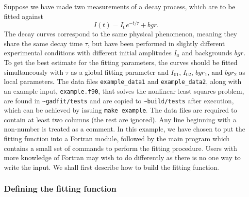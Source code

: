 \documentclass{article}
\begin{document}
Suppose we have made two measurements of a decay process, which are to be fitted against
\begin{equation}
  \label{eq:exp_decay}
  I(t) = I_0e^{-t/\tau} + bgr.
\end{equation}
The decay curves correspond to the same physical phenomenon, meaning they share the same decay time $\tau$, but have been performed in slightly different experimental conditions with different initial amplitudes $I_0$ and backgrounds $bgr$. To get the best estimate for the fitting parameters, the curves should be fitted simultaneously with $\tau$ as a global fitting parameter and $I_{01}$, $I_{02}$, $bgr_1$, and $bgr_2$ as local parameters. The data files \verb+example_data1+ and \verb+example_data2+, along with an example input, \verb+example.f90+, that solves the nonlinear least squares problem, are found in \verb+~gadfit/tests+ and are copied to \verb+~build/tests+ after execution, which can be achieved by issuing \texttt{make example}. The data files are required to contain at least two columns (the rest are ignored). Any line beginning with a non-number is treated as a comment. In this example, we have chosen to put the fitting function into a Fortran module, followed by the main program which contains a small set of commands to perform the fitting procedure. Users with more knowledge of Fortran may wish to do differently as there is no one way to write the input. We shall first describe how to build the fitting function.

\subsubsection{Defining the fitting function}
\end{document}
